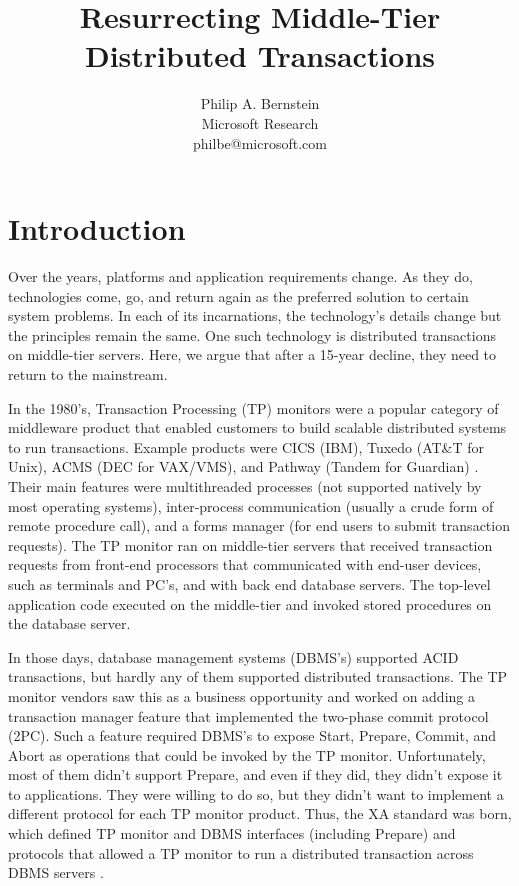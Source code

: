 \documentclass[11pt]{article}
\begin{document}
\title{Resurrecting Middle-Tier Distributed Transactions}
\author{Philip A. Bernstein\\Microsoft Research\\philbe@microsoft.com}



\section{Introduction}
Over the years, platforms and application requirements change. As they do, technologies come, go, and return again as the preferred solution to certain system problems. In each of its incarnations, the technology's details change but the principles remain the same. One such technology is distributed transactions on middle-tier servers. Here, we argue that after a 15-year decline, they need to return to the mainstream. 

In the 1980's, Transaction Processing (TP) monitors were a popular category of middleware product that enabled customers to build scalable distributed systems to run transactions. Example products were CICS (IBM), Tuxedo (AT\&T for Unix), ACMS (DEC for VAX/VMS), and Pathway (Tandem for Guardian) \cite{4}. Their main features were multithreaded processes (not supported natively by most operating systems), inter-process communication (usually a crude form of remote procedure call), and a forms manager (for end users to submit transaction requests). The TP monitor ran on middle-tier servers that received transaction requests from front-end processors that communicated with end-user devices, such as terminals and PC's, and with back end database servers. The top-level application code executed on the middle-tier and invoked stored procedures on the database server.  
 
In those days, database management systems (DBMS's) supported ACID transactions, but hardly any of them supported distributed transactions. The TP monitor vendors saw this as a business opportunity and worked on adding a transaction manager feature that implemented the two-phase commit protocol (2PC). Such a feature required DBMS's to expose Start, Prepare, Commit, and Abort as operations that could be invoked by the TP monitor. Unfortunately, most of them didn't support Prepare, and even if they did, they didn't expose it to applications. They were willing to do so, but they didn't want to implement a different protocol for each TP monitor product. Thus, the XA standard was born, which defined TP monitor and DBMS interfaces (including Prepare) and protocols that allowed a TP monitor to run a distributed transaction across DBMS servers \cite{18}. 
 
\end{document}
